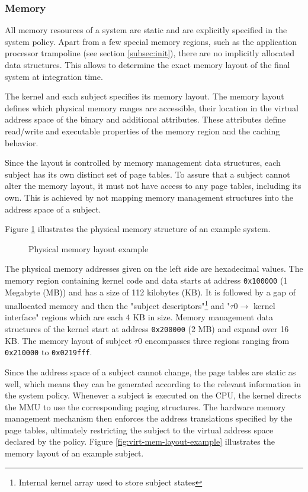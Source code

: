\subsubsection{Memory}
All memory resources of a system are static and are explicitly specified in the
system policy. Apart from a few special memory regions, such as the application
processor trampoline (see section \ref{subsec:init}), there are no implicitly
allocated data structures. This allows to determine the exact memory layout of
the final system at integration time.

The kernel and each subject specifies its memory layout. The memory layout
defines which physical memory ranges are accessible, their location in the
virtual address space of the binary and additional attributes. These attributes
define read/write and executable properties of the memory region and the caching
behavior.

Since the layout is controlled by memory management data structures,
each subject has its own distinct set of page tables. To assure that a subject
cannot alter the memory layout, it must not have access to any page tables,
including its own. This is achieved by not mapping memory management structures
into the address space of a subject.

Figure \ref{fig:phys-mem-layout-example} illustrates the physical memory
structure of an example system.

\begin{figure}[h]
	\centering
	
	\caption{Physical memory layout example}
	\label{fig:phys-mem-layout-example}
\end{figure}

The physical memory addresses given on the left side are hexadecimal values.
The memory region containing kernel code and data starts at address
\texttt{0x100000} (1 Megabyte (MB)) and has a size of 112 kilobytes (KB). It is
followed by a gap of unallocated memory and then the "subject
descriptors"\footnote{Internal kernel array used to store subject states} and
"$\tau0\rightarrow$ kernel interface" regions which are each 4 KB in size.
Memory management data structures of the kernel start at address
\texttt{0x200000} (2 MB) and expand over 16 KB. The memory layout of subject
$\tau0$ encompasses three regions ranging from \texttt{0x210000} to
\texttt{0x0219fff}.

Since the address space of a subject cannot change, the page tables are static
as well, which means they can be generated according to the relevant information
in the system policy. Whenever a subject is executed on the CPU, the kernel
directs the MMU to use the corresponding paging structures. The hardware memory
management mechanism then enforces the address translations specified by the
page tables, ultimately restricting the subject to the virtual address space
declared by the policy. Figure \ref{fig:virt-mem-layout-example} illustrates the
memory layout of an example subject.

